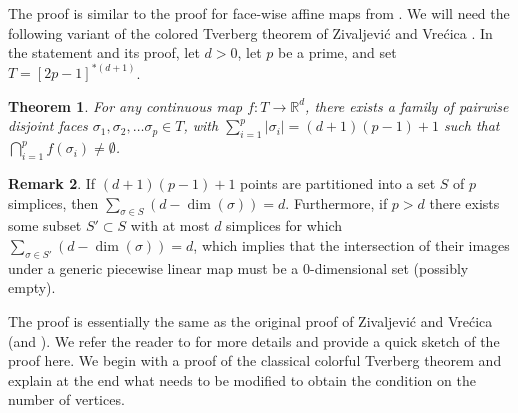 \documentclass[12pt,a4paper,oneside]{amsart}\sloppy
\newtheorem{theorem}{Theorem}%
\theoremstyle{definition}
\newtheorem{remark}[theorem]{Remark}
\begin{document}
The proof is similar to the proof for face-wise affine maps from \cite{abfk}. We will need the following variant of the colored Tverberg theorem of Zivaljevi\'c and Vre\'cica \cite{zi-vre92}. In the statement and its proof, let $d>0$, let $p$ be a prime, and set $T = [2p-1]^{*(d+1)}$.

\begin{theorem}\label{col_tv} For any continuous map $f\colon T \to \mathbb R^d$, there exists a family of pairwise disjoint faces $\sigma_1,\sigma_2, \ldots \sigma_p \in T$, with $\sum_{i=1}^p |\sigma_i|=(d+1)(p-1)+1$ such that $\bigcap_{i=1}^p f(\sigma_i)\neq \emptyset$.
 \end{theorem}

\begin{remark} \label{rem: d simplices} If $(d+1)(p-1)+1$ points are partitioned into a set $S$ of $p$ simplices, then $\sum_{\sigma \in S} (d-\dim(\sigma))=d$. Furthermore, if $p>d$ there exists some subset $S'\subset S$ with at most $d$ simplices for which $\sum_{\sigma \in S'} (d-\dim(\sigma))=d$, which implies that the intersection of their images under a generic piecewise linear map must be a $0$-dimensional set (possibly empty).
\end{remark}

The proof is essentially the same as the original proof of Zivaljevi\'c and Vre\'cica \cite{zi-vre92} (and \cite{blvz94}). We refer the reader to \cite{matousek2003using} for more details and provide a quick sketch of the proof here. We begin with a proof of the classical colorful Tverberg theorem and explain at the end what needs to be modified to obtain the condition on the number of vertices.
\end{document}
